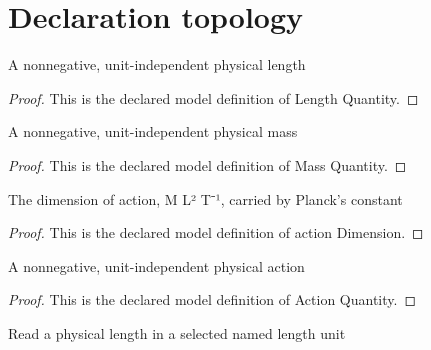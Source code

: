 \section{Declaration topology}
\begin{definition}
  \label{def:physics:phyx-mini-0643:phyxminiproblems-problemphyxmini0643-lengthquantity}
  A nonnegative, unit-independent physical length
\end{definition}
\begin{proof}
  This is the declared model definition of Length Quantity.
\end{proof}
\begin{definition}
  \label{def:physics:phyx-mini-0643:phyxminiproblems-problemphyxmini0643-massquantity}
  A nonnegative, unit-independent physical mass
\end{definition}
\begin{proof}
  This is the declared model definition of Mass Quantity.
\end{proof}
\begin{definition}
  \label{def:physics:phyx-mini-0643:phyxminiproblems-problemphyxmini0643-actiondimension}
  The dimension of action, M L² T⁻¹, carried by Planck's constant
\end{definition}
\begin{proof}
  This is the declared model definition of action Dimension.
\end{proof}
\begin{definition}
  \label{def:physics:phyx-mini-0643:phyxminiproblems-problemphyxmini0643-actionquantity}
  A nonnegative, unit-independent physical action
\end{definition}
\begin{proof}
  This is the declared model definition of Action Quantity.
\end{proof}
\begin{definition}
  \label{def:physics:phyx-mini-0643:phyxminiproblems-problemphyxmini0643-lengthreadout}
  Read a physical length in a selected named length unit
\end{definition}
